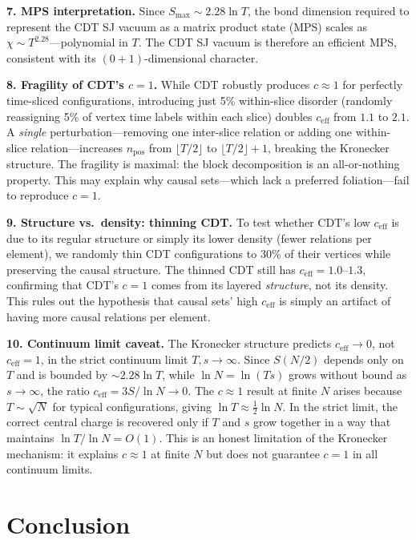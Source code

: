 \documentclass[aps,prd,twocolumn,superscriptaddress,nofootinbib]{revtex4-2}
\begin{document}
\textbf{7. MPS interpretation.} Since $S_{\max} \sim 2.28 \ln T$, the bond dimension required to represent the CDT SJ vacuum as a matrix product state (MPS) scales as $\chi \sim T^{2.28}$---polynomial in $T$. The CDT SJ vacuum is therefore an efficient MPS, consistent with its $(0+1)$-dimensional character.

\textbf{8. Fragility of CDT's $c = 1$.} While CDT robustly produces $c \approx 1$ for perfectly time-sliced configurations, introducing just 5\% within-slice disorder (randomly reassigning 5\% of vertex time labels within each slice) doubles $c_{\mathrm{eff}}$ from $1.1$ to $2.1$. A \emph{single} perturbation---removing one inter-slice relation or adding one within-slice relation---increases $n_{\mathrm{pos}}$ from $\lfloor T/2 \rfloor$ to $\lfloor T/2 \rfloor + 1$, breaking the Kronecker structure. The fragility is maximal: the block decomposition is an all-or-nothing property. This may explain why causal sets---which lack a preferred foliation---fail to reproduce $c = 1$.

\textbf{9. Structure vs.\ density: thinning CDT.} To test whether CDT's low $c_{\mathrm{eff}}$ is due to its regular structure or simply its lower density (fewer relations per element), we randomly thin CDT configurations to 30\% of their vertices while preserving the causal structure. The thinned CDT still has $c_{\mathrm{eff}} = 1.0$--$1.3$, confirming that CDT's $c = 1$ comes from its layered \emph{structure}, not its density. This rules out the hypothesis that causal sets' high $c_{\mathrm{eff}}$ is simply an artifact of having more causal relations per element.

\textbf{10. Continuum limit caveat.} The Kronecker structure predicts $c_{\mathrm{eff}} \to 0$, not $c_{\mathrm{eff}} = 1$, in the strict continuum limit $T, s \to \infty$. Since $S(N/2)$ depends only on $T$ and is bounded by $\sim 2.28 \ln T$, while $\ln N = \ln(Ts)$ grows without bound as $s \to \infty$, the ratio $c_{\mathrm{eff}} = 3S/\ln N \to 0$. The $c \approx 1$ result at finite $N$ arises because $T \sim \sqrt{N}$ for typical configurations, giving $\ln T \approx \frac{1}{2}\ln N$. In the strict limit, the correct central charge is recovered only if $T$ and $s$ grow together in a way that maintains $\ln T / \ln N = O(1)$. This is an honest limitation of the Kronecker mechanism: it explains $c \approx 1$ at finite $N$ but does not guarantee $c = 1$ in all continuum limits.

\section{Conclusion}
\end{document}
